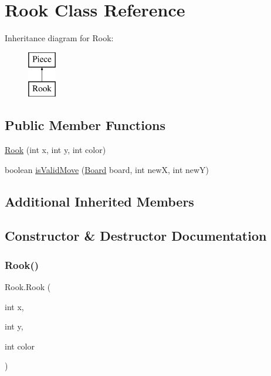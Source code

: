 \hypertarget{class_rook}{}\section{Rook Class Reference}
\label{class_rook}
Inheritance diagram for Rook\+:\begin{figure}[H]
\begin{center}
\leavevmode
\includegraphics[height=2.000000cm]{class_rook}
\end{center}
\end{figure}
\subsection*{Public Member Functions}
\begin{DoxyCompactItemize}
\item 
\mbox{\hyperlink{class_rook_a4bf557763d9c18fcdc8d83f6a86a5d85}{Rook}} (int x, int y, int color)
\item 
boolean \mbox{\hyperlink{class_rook_a8a9f0e7a8d18a855bd608bfe945c62b4}{is\+Valid\+Move}} (\mbox{\hyperlink{class_board}{Board}} board, int newX, int newY)
\end{DoxyCompactItemize}
\subsection*{Additional Inherited Members}


\subsection{Constructor \& Destructor Documentation}
\mbox{\label{class_rook_a4bf557763d9c18fcdc8d83f6a86a5d85}} 
\subsubsection{\texorpdfstring{Rook()}{Rook()}}
{\footnotesize\ttfamily Rook.\+Rook (\begin{DoxyParamCaption}\item[{int}]{x,  }\item[{int}]{y,  }\item[{int}]{color }\end{DoxyParamCaption})\hspace{0.3cm}{\ttfamily [inline]}}

